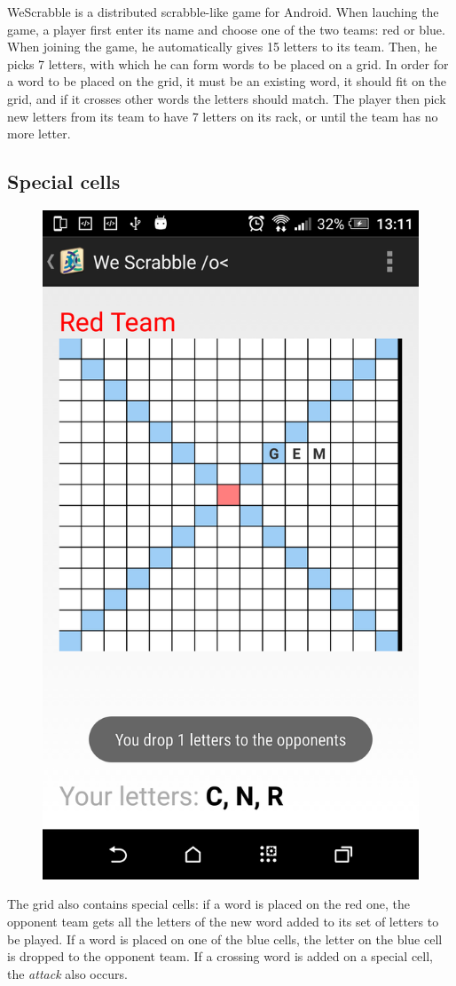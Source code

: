\documentclass[a4paper,12pt]{article}
\begin{document}
WeScrabble is a distributed scrabble-like game for Android. When lauching the game, a player first enter its name and choose one of the two teams: red or blue.
When joining the game, he automatically gives 15 letters to its team. Then, he picks 7 letters, with which he can form words to be placed on a grid. In order for a word to be placed on the grid, it must be an existing word, it should fit on the grid, and if it crosses other words the letters should match. The player then pick new letters from its team to have 7 letters on its rack, or until the team has no more letter.

\subsection{Special cells}
\begin{figure}[H]
  \center
  \includegraphics[width=.3\textwidth]{dropletter.png}
\end{figure}

The grid also contains special cells: if a word is placed on the red one, the opponent team gets all the letters of the new word added to its set of letters to be played. If a word is placed on one of the blue cells, the letter on the blue cell is dropped to the opponent team. If a crossing word is added on a special cell, the \textit{attack} also occurs.
\end{document}
